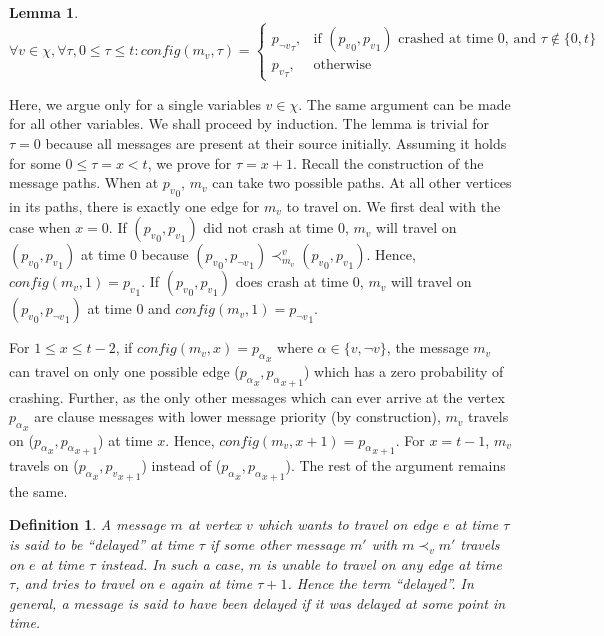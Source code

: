 \documentclass[11pt,eepic]{article}
\newcommand{\set}[1]{\{ #1  \}}
\newtheorem{lemma}[theorem]{Lemma}
\newtheorem{definition}{Definition}[section]
\def\eod{\vrule height 6pt width 5pt depth 0pt}
\newenvironment{proof}{\noindent {\bf Proof:} \hspace{.677em}}
	                      {\hspace*{\fill}{\eod}}
\begin{document}
		\begin{lemma}
		\label{lem:var_config}
		\[
		    \forall v\in\chi, \forall\tau, 0\leq\tau\leq t: config(m_v,\tau) =
		\begin{cases}
		    {p_{\neg v}}_\tau,& \text{if } ({p_v}_0,{p_v}_1) \text{ crashed at time 0, and }\tau\notin\set{0,t}\\
			{p_v}_\tau, & \text{otherwise}
		\end{cases}
		\]
		\end{lemma}
		\begin{proof}
		Here, we argue only for a single variables $v\in\chi$. The same argument can be made for all other variables. We shall proceed by induction. The lemma is trivial for $\tau=0$ because all messages are present at their source initially. Assuming it holds for some $0\leq\tau=x<t$, we prove for $\tau=x+1$. Recall the construction of the message paths. When at ${p_v}_0$, $m_v$ can take two possible paths. At all other vertices in its paths, there is exactly one edge for $m_v$ to travel on. We first deal with the case when $x=0$. If $({p_v}_0,{p_v}_1)$ did not crash at time 0, $m_v$ will travel on $({p_v}_0,{p_v}_1)$ at time 0 because $({p_v}_0,{p_{\neg v}}_1) \prec_{m_v}^v ({p_v}_0,{p_v}_1)$. Hence, $config(m_v,1)={p_v}_1$. If $({p_v}_0,{p_v}_1)$ does crash at time 0, $m_v$ will travel on $({p_v}_0,{p_{\neg v}}_1)$ at time 0 and $config(m_v,1)={p_{\neg v}}_1$.

		For $1\leq x\leq t-2$, if $config(m_v,x) = {p_\alpha}_x$ where $\alpha\in\set{v,\neg v}$, the message $m_v$ can travel on only one possible edge (${p_\alpha}_x,{p_\alpha}_{x+1}$) which has a zero probability of crashing. Further, as the only other messages which can ever arrive at the vertex ${p_\alpha}_x$ are clause messages with lower message priority (by construction), $m_v$ travels on (${p_\alpha}_x,{p_\alpha}_{x+1}$) at time $x$. Hence, $config(m_v,x+1) = {p_\alpha}_{x+1}$. For $x=t-1$, $m_v$ travels on (${p_\alpha}_x,{p_v}_{x+1}$) instead of (${p_\alpha}_x,{p_\alpha}_{x+1}$). The rest of the argument remains the same.
		\end{proof}

		\begin{definition}
		A message $m$ at vertex $v$ which wants to travel on edge $e$ at time $\tau$ is said to be ``delayed'' at time $\tau$ if some other message $m'$ with $m \prec_v m'$ travels on $e$ at time $\tau$ instead. In such a case, $m$ is unable to travel on any edge at time $\tau$, and tries to travel on $e$ again at time $\tau+1$. Hence the term ``delayed''. In general, a message is said to have been delayed if it was delayed at some point in time.
		\end{definition}
\end{document}
